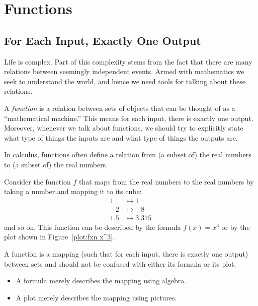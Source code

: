 \chapter{Functions}

\section{For Each Input, Exactly One Output}

Life is complex. Part of this complexity stems from the fact that
there are many relations between seemingly independent events. Armed
with mathematics we seek to understand the world, and hence we need
tools for talking about these relations.

A \textit{function} is a relation between sets of objects that can be
thought of as a ``mathematical machine.'' This means for each input,
there is exactly one output. Moreover, whenever we talk about
functions, we should try to explicitly state what type of things the
inputs are and what type of things the outputs are.

In calculus, functions often define a relation from (a subset of) the
real numbers to (a subset of) the real numbers.


\begin{example}
Consider the function $f$ that maps from the real numbers to the real
numbers by taking a number and mapping it to its cube:
\begin{align*}
1 &\mapsto 1\\
-2 &\mapsto -8\\
1.5 &\mapsto 3.375
\end{align*}
and so on. This function can be described by the formula $f(x)=x^3$ or
by the plot shown in Figure~\ref{plot:fxn x^3}.
\end{example}

\begin{warning}
A function is a mapping (such that for each input, there is exactly one
output) between sets and should not be confused with either its
formula or its plot.
\begin{itemize}
\item A formula merely describes the mapping using algebra.
\item A plot merely describes the mapping using pictures. 
\end{itemize}
\end{warning}


